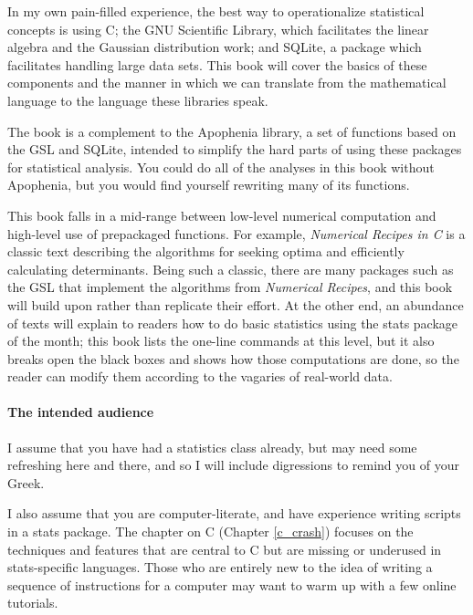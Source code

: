 \documentclass[12pt,notitlepage, openany]{book}
\begin{document}
In my own pain-filled experience, the best way to operationalize
statistical concepts is using C; the GNU Scientific Library,  which
facilitates the linear algebra and the Gaussian distribution work;
and SQLite, a package which facilitates handling large data sets. This
book will cover the basics of these components and the manner in which
we can translate from the mathematical language to the language these
libraries speak.

The book is a complement to the Apophenia library, a set of functions 
based on the GSL and SQLite, intended to simplify the hard parts of
using these packages for statistical analysis. You could do all of the
analyses in this book without Apophenia, but you would find yourself
rewriting many of its functions. 

This book falls in a mid-range between low-level numerical
computation and high-level use of prepackaged functions. For example,
{\sl Numerical Recipes in C} \citep{recipesinc} is a classic text
describing the algorithms for seeking optima and efficiently calculating
determinants. Being such a classic, there are many packages such as the
GSL that implement the algorithms from {\sl Numerical Recipes}, and this
book will build upon rather than replicate their effort. At the other
end, an abundance of texts will explain to readers how to do basic
statistics using the stats package of the month; this book lists the
one-line commands at this level, but it also breaks open the black boxes
and shows how those computations are done, so the reader can modify them
according to the vagaries of real-world data.

\paragraph{The intended audience}
I assume that you have had a statistics class already, but may need some
refreshing here and there, and so I will include digressions to remind you
of your Greek.

I also assume that you are computer-literate, and have experience writing
scripts in a stats package. The chapter on C (Chapter \ref{c_crash})
focuses on the techniques and features that are central to C but are
missing or underused in stats-specific languages. Those who are entirely
new to the idea of writing a sequence of instructions for a computer
may want to warm up with a few online tutorials.
\end{document}
